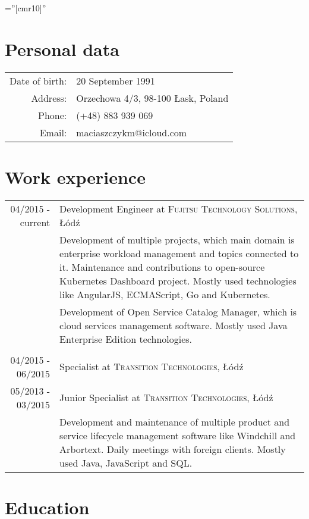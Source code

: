\documentclass[a4paper,10pt]{article}
\begin{document}
\font\fb=''[cmr10]'' 
\par{}

\section{Personal data}

\begin{tabular}{rl}
    Date of birth: & 20 September 1991 \\
    Address: & Orzechowa 4/3, 98-100 Łask, Poland \\
    Phone: & (+48) 883 939 069\\
    Email: & maciaszczykm@icloud.com
\end{tabular}

\section{Work experience}

\begin{tabular}{r|p{11cm}}
04/2015 - current & Development Engineer at \textsc{Fujitsu Technology Solutions}, Łódź \\
 & \footnotesize{Development of multiple projects, which main domain is enterprise workload management and topics connected to it. Maintenance and contributions to open-source Kubernetes Dashboard project. Mostly used technologies like AngularJS, ECMAScript, Go and Kubernetes.}\\
 & \footnotesize{Development of Open Service Catalog Manager, which is cloud services management software. Mostly used Java Enterprise Edition technologies.}\\\multicolumn{2}{c}{} \\
 
04/2015 - 06/2015 & Specialist at \textsc{Transition Technologies}, Łódź \\
05/2013 - 03/2015 & Junior Specialist at \textsc{Transition Technologies}, Łódź \\
 & \footnotesize{Development and maintenance of multiple product and service lifecycle management software like Windchill and Arbortext. Daily meetings with foreign clients. Mostly used Java, JavaScript and SQL.}\\
\end{tabular}

\section{Education}
\end{document}
